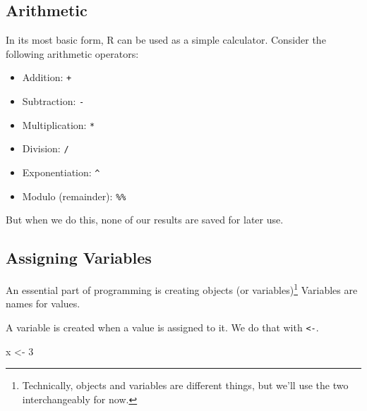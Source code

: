 \documentclass[]{book}
\newenvironment{Shaded}{\begin{snugshade}}{\end{snugshade}}
\newcommand{\CommentTok}[1]{\textcolor[rgb]{0.56,0.35,0.01}{\textit{#1}}}
\newcommand{\DecValTok}[1]{\textcolor[rgb]{0.00,0.00,0.81}{#1}}
\newcommand{\NormalTok}[1]{#1}
\newcommand{\OperatorTok}[1]{\textcolor[rgb]{0.81,0.36,0.00}{\textbf{#1}}}
\newcommand{\StringTok}[1]{\textcolor[rgb]{0.31,0.60,0.02}{#1}}
\providecommand{\tightlist}{%
  \setlength{\itemsep}{0pt}\setlength{\parskip}{0pt}}
\let\rmarkdownfootnote\footnote%
\def\footnote{\protect\rmarkdownfootnote}
\begin{document}
\hypertarget{arithmetic}{%
\subsection{Arithmetic}\label{arithmetic}}

In its most basic form, R can be used as a simple calculator. Consider the following arithmetic operators:

\begin{itemize}
\tightlist
\item
  Addition: \texttt{+}
\item
  Subtraction: \texttt{-}
\item
  Multiplication: \texttt{*}
\item
  Division: \texttt{/}
\item
  Exponentiation: \texttt{\^{}}
\item
  Modulo (remainder): \texttt{\%\%}
\end{itemize}

\begin{Shaded}
\end{Shaded}

But when we do this, none of our results are saved for later use.

\hypertarget{assigning-variables}{%
\subsection{Assigning Variables}\label{assigning-variables}}

An essential part of programming is creating objects (or variables)\footnote{Technically, objects and variables are different things, but we'll use the two interchangeably for now.} Variables are names for values.

A variable is created when a value is assigned to it. We do that with \texttt{\textless{}-}.

\begin{Shaded}
\begin{Highlighting}[]
\NormalTok{x <-}\StringTok{ }\DecValTok{3}
\end{Highlighting}
\end{Shaded}
\end{document}

